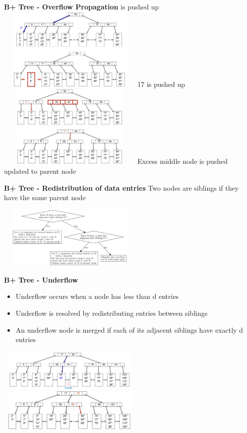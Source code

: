 \documentclass[10pt, landscape]{article}
\begin{document}
\begin{multicols}{4}
\textbf{B+ Tree - Overflow Propagation}
 is pushed up
\includegraphics[width=7cm, height=4cm]{overflow_progpagation1.png}
17 is pushed up
\includegraphics[width=7cm, height=4cm]{overflow_progpagation2.png}
Excess middle node is pushed updated to parent node \newline


\textbf{B+ Tree - Redistribution of data entries} \newline
Two nodes are siblings if they have the same parent node \newline

\includegraphics[width=7cm, height=3cm]{overflow_redistribution.png}

\textbf{B+ Tree - Underflow}
\begin{itemize}
  \item Underflow occurs when a node has less than d entries
  \item Underflow is resolved by redistributing entries between siblings
  \item An underflow node is merged if each of its adjacent siblings have exactly d entries
\end{itemize}

\includegraphics[width=7cm, height=2cm]{merge_nodes.png}
\includegraphics[width=7cm, height=2cm]{merge_parent.png}


\end{multicols}
\end{document}
